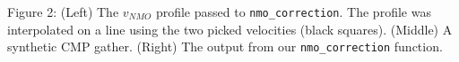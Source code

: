 Figure 2: (Left) The $v_{NMO}$ profile passed to
\texttt{nmo\_correction}.
The profile was interpolated on a line using the two picked velocities (black
squares). (Middle) A synthetic CMP gather. (Right) The output
from our \texttt{nmo\_correction} function.
